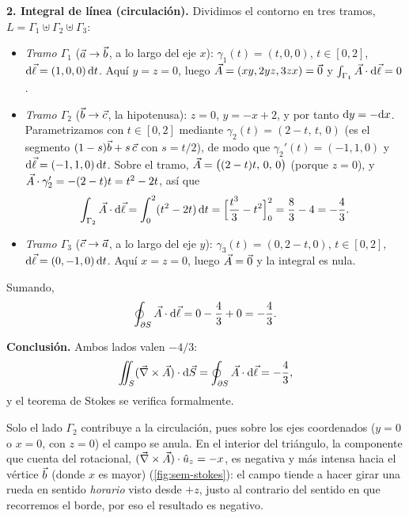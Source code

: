 \begin{resolucion}
\textbf{2. Integral de línea (circulación).} Dividimos el contorno en tres tramos,
$L=\Gamma_1\uplus\Gamma_2\uplus\Gamma_3$:
\begin{itemize}
  \item \emph{Tramo $\Gamma_1$} ($\vec{a}\to\vec{b}$, a lo largo del eje $x$): $\gamma_1(t)=(t,0,0)$, $t\in[0,2]$,
        $\mathrm{d}\vec{\ell}=(1,0,0)\,\mathrm{d} t$. Aquí $y=z=0$, luego $\vec{A}=(xy,2yz,3zx)=\vec{0}$ y $\int_{\Gamma_1}\vec{A}\cdot\mathrm{d}\vec{\ell}=0$.
  \item \emph{Tramo $\Gamma_2$} ($\vec{b}\to\vec{c}$, la hipotenusa): $z=0$, $y=-x+2$, y por
        tanto $\mathrm{d} y=-\mathrm{d} x$. Parametrizamos con $t\in[0,2]$ mediante
        $\gamma_2(t)=(2-t,\,t,\,0)$ (es el segmento $(1-s)\vec{b}+s\,\vec{c}$ con $s=t/2$), de modo que
        $\gamma_2'(t)=(-1,1,0)$ y $\mathrm{d}\vec{\ell}=(-1,1,0)\,\mathrm{d} t$. Sobre el tramo, $\vec{A}=\bigl((2-t)t,\,0,\,0\bigr)$ (porque $z=0$), y
        $\vec{A}\cdot\gamma_2'=-(2-t)t=t^{2}-2t$, así que
        \[
          \int_{\Gamma_2}\vec{A}\cdot\mathrm{d}\vec{\ell}=\int_0^2(t^{2}-2t)\,\mathrm{d} t=\Bigl[\frac{t^{3}}{3}-t^{2}\Bigr]_0^2=\frac83-4=-\frac43 .
        \]
  \item \emph{Tramo $\Gamma_3$} ($\vec{c}\to\vec{a}$, a lo largo del eje $y$): $\gamma_3(t)=(0,2-t,0)$, $t\in[0,2]$,
        $\mathrm{d}\vec{\ell}=(0,-1,0)\,\mathrm{d} t$. Aquí $x=z=0$, luego $\vec{A}=\vec{0}$ y la integral es nula.
\end{itemize}
Sumando,
\[
  \oint_{\partial S}\vec{A}\cdot\mathrm{d}\vec{\ell}=0-\frac43+0=-\frac43 .
\]

\textbf{Conclusión.} Ambos lados valen $-4/3$:
\[
  \iint_S(\vec{\nabla}\times\vec{A})\cdot\mathrm{d}\vec{S}=\oint_{\partial S}\vec{A}\cdot\mathrm{d}\vec{\ell}=-\frac43 ,
\]
y el teorema de Stokes se verifica formalmente.
\end{resolucion}

\begin{observacion}
Solo el lado $\Gamma_2$ contribuye a la circulación, pues sobre los ejes
coordenados ($y=0$ o $x=0$, con $z=0$) el campo se anula. En el interior del
triángulo, la componente que cuenta del rotacional, $(\vec{\nabla}\times\vec{A})\cdot\hat{u}_{z}=-x$, es
negativa y más intensa hacia el vértice $\vec{b}$ (donde $x$ es mayor) (\cref{fig:sem-stokes}):
el campo tiende a hacer girar una rueda en sentido \emph{horario} visto desde
$+z$, justo al contrario del sentido en que recorremos el borde, por eso el
resultado es negativo.
\end{observacion}



